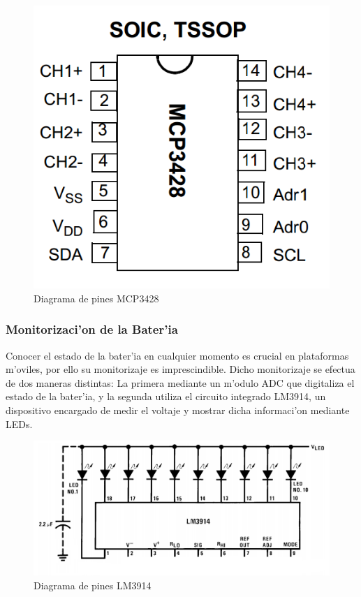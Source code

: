 \documentclass[twoside,12pt]{article}
\begin{document}
\begin{figure}[ht]
\centering
\includegraphics[scale=0.30]{images/MCP3428_pin_diagram.png}
\caption{Diagrama de pines MCP3428}
\label{fig:MCP3428}
\end{figure} 


\subsubsection{Monitorizaci'on de la Bater'ia}
Conocer el estado de la bater'ia en cualquier momento es crucial en plataformas m'oviles, por ello su monitorizaje es imprescindible. Dicho monitorizaje se efectua de dos maneras distintas: La primera mediante un m'odulo ADC que digitaliza el estado de la bater'ia, y la segunda utiliza el circuito integrado LM3914, un dispositivo encargado de medir el voltaje y mostrar dicha informaci'on mediante LEDs.

\begin{figure}[ht]
\centering
\includegraphics[scale=0.30]{images/LM3914_pin_diagram.png}
\caption{Diagrama de pines LM3914}
\label{fig:LM3914}
\end{figure} 
\end{document}
